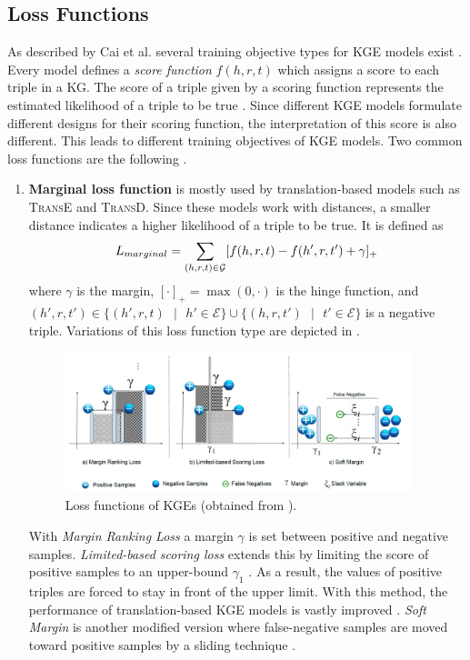 \subsection{Loss Functions} 
\label{subsec:loss_functions}
%
As described by Cai et al. several training objective types for \ac{KGE} models exist \cite{cai2017kbgan}.
Every model defines a \textit{score function} $f(h,r,t)$ which assigns a score to each triple  in a \ac{KG}.
The score of a triple given by a scoring function represents the estimated likelihood of a triple to be true \cite{cai2017kbgan}.
Since different \ac{KGE} models formulate different designs for their scoring function, the interpretation of this score is also different.
This leads to different training objectives of \ac{KGE} models.
Two common loss functions are the following \cite{cai2017kbgan}.
\begin{enumerate}
    \item 
    \textbf{Marginal loss function} is mostly used by translation-based models such as \textsc{TransE} and \textsc{TransD}.
    Since these models work with distances, a smaller distance indicates a higher likelihood of a triple to be true.
    It is defined as 
    \begin{equation}
        L_{marginal}=\sum_{(h,r,t)\in\mathcal{G}}[f(h,r,t)-f(h',r,t')+\gamma]_+\label{eq:marginalloss}
    \end{equation}
    where $\gamma$ is the margin, $[\cdot]_+=\max(0, \cdot)$ is the hinge function, and $(h',r,t') \in \{(h',r,t)\text{ }|\text{ }h' \in \mathcal{E}\} \cup \{(h,r,t')\text{ }|\text{ }t' \in \mathcal{E}\}$ is a negative triple.
    Variations of this loss function type are depicted in .
    \begin{figure}[t]
      \centering
        \includegraphics[width=0.95\textwidth]{figures/loss_functions.PNG}
      \caption{Loss functions of \acp{KGE} (obtained from \cite{9207513}).}
      \label{fig:loss_functions}
    \end{figure}
    With \textit{Margin Ranking Loss} a margin $\gamma$ is set between positive and negative samples.
    \textit{Limited-based scoring loss} extends this by limiting the score of positive samples to an upper-bound $\gamma_1$ \cite{9207513}.
    As a result, the values of positive triples are forced to stay in front of the upper limit.
    With this method, the performance of translation-based KGE models is vastly improved \cite{9207513}.
    \textit{Soft Margin} is another modified version where false-negative samples are moved toward positive samples by a sliding technique \cite{9207513}.     
    

\end{enumerate}
